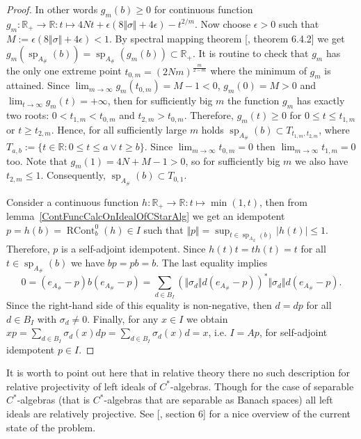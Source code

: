\begin{proof}
In other words $g_m(b)\geq 0$ for continuous function
$g_m:\mathbb{R}_+\to\mathbb{R}:t\mapsto
4Nt+\epsilon(8\Vert\sigma\Vert+4\epsilon)-t^{2/m}$. Now choose $\epsilon>0$ such
that $M:=\epsilon(8\Vert\sigma\Vert+4\epsilon)<1$.  By spectral mapping theorem
[\cite{HelLectAndExOnFuncAn}, theorem 6.4.2] we get
$g_m(\operatorname{sp}_{A_\#}(b))
=\operatorname{sp}_{A_\#}(g_m(b))\subset\mathbb{R}_+$.
It is routine to check that $g_m$ has the only one extreme point
$t_{0,m}={(2Nm)}^{\frac{m}{2-m}}$ where the minimum of $g_m$ is attained. Since
$\lim_{m\to\infty} g_m(t_{0,m})=M-1<0$, $g_m(0)=M>0$ and $\lim_{t\to\infty}
g_m(t)=+\infty$, then for sufficiently big $m$ the function $g_m$ has exactly
two roots: $0<t_{1,m}<t_{0,m}$ and $t_{2,m} > t_{0,m}$. Therefore, $g_m(t)\geq 0$
for $0\leq t\leq t_{1,m}$ or $t\geq t_{2,m}$. Hence, for all sufficiently large
$m$ holds $\operatorname{sp}_{A_\#}(b)\subset T_{t_{1,m},t_{2,m}}$, 
where $T_{a, b}:=\{t\in\mathbb{R} : 0\leq t \leq a \vee t \geq b\}$. 
Since $\lim_{m\to\infty} t_{0,m}=0$ then $\lim_{m\to\infty} t_{1,m}=0$ too. 
Note that $g_m(1)=4N+M-1>0$, so for sufficiently big $m$ we also 
have $t_{2,m}\leq 1$. Consequently,
$\operatorname{sp}_{A_\#}(b)\subset T_{0,1}$.

Consider a continuous function $h:\mathbb{R}_+\to\mathbb{R}:t\mapsto\min(1, t)$,
then from lemma~\ref{ContFuncCalcOnIdealOfCStarAlg} we get an idempotent
$p=h(b)=\operatorname{RCont}_b^0(h)\in I$ such that $\Vert
p\Vert=\sup_{t\in\operatorname{sp}_{A_\#}(b)}|h(t)|\leq 1$. Therefore, $p$ is a
self-adjoint idempotent. Since $h(t)t=th(t)=t$ for all $t\in
\operatorname{sp}_{A_\#}(b)$ we have $bp=pb=b$. The last equality implies
$$
0=(e_{A_\#}-p)b(e_{A_\#}-p)
=\sum_{d\in B_I}
    {(\Vert\sigma_d\Vert d(e_{A_\#}-p))}^*\Vert\sigma_d\Vert d(e_{A_\#}-p).
$$
Since the right-hand side of this equality is non-negative, then $d=dp$ for all
$d\in B_I$ with $\sigma_d\neq 0$. Finally, for any $x\in I$ we obtain
$xp=\sum_{d\in B_I}\sigma_d(x)dp=\sum_{d\in B_I}\sigma_d(x)d=x$, i.e. $I=Ap$,
for self-adjoint idempotent $p\in I$.
\end{proof}

It is worth to point out here that in relative theory there no such description
for relative projectivity of left ideals of $C^*$-algebras. Though for the case
of separable $C^*$-algebras (that is $C^*$-algebras that are separable as Banach
spaces) all left ideals are relatively projective. See
[\cite{LykProjOfBanAndCStarAlgsOfContFld}, section 6] for a nice overview of the
current state of the problem.

